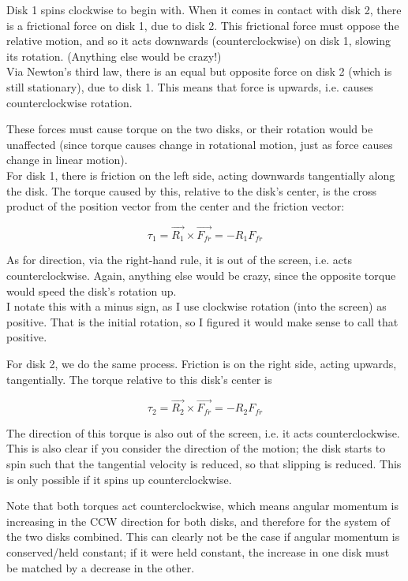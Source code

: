 \documentclass[8.01x]{subfiles}
\begin{document}
Disk 1 spins clockwise to begin with. When it comes in contact with disk 2, there is a frictional force on disk 1, due to disk 2. This frictional force must oppose the relative motion, and so it acts downwards (counterclockwise) on disk 1, slowing its rotation. (Anything else would be crazy!)\\
Via Newton's third law, there is an equal but opposite force on disk 2 (which is still stationary), due to disk 1. This means that force is upwards, i.e. causes counterclockwise rotation.

These forces must cause torque on the two disks, or their rotation would be unaffected (since torque causes change in rotational motion, just as force causes change in linear motion).\\
For disk 1, there is friction on the left side, acting downwards tangentially along the disk. The torque caused by this, relative to the disk's center, is the cross product of the position vector from the center and the friction vector:

\begin{equation}
\tau_1 = \vec{R_1} \times \vec{F_{fr}} = -R_1 F_{fr}
\end{equation}

As for direction, via the right-hand rule, it is out of the screen, i.e. acts counterclockwise. Again, anything else would be crazy, since the opposite torque would speed the disk's rotation up.\\
I notate this with a minus sign, as I use clockwise rotation (into the screen) as positive. That is the initial rotation, so I figured it would make sense to call that positive.

For disk 2, we do the same process. Friction is on the right side, acting upwards, tangentially. The torque relative to this disk's center is

\begin{equation}
\tau_2 = \vec{R_2} \times \vec{F_{fr}} = -R_2 F_{fr}
\end{equation}

The direction of this torque is also out of the screen, i.e. it acts counterclockwise. This is also clear if you consider the direction of the motion; the disk starts to spin such that the tangential velocity is reduced, so that slipping is reduced. This is only possible if it spins up counterclockwise.

Note that both torques act counterclockwise, which means angular momentum is increasing in the CCW direction for both disks, and therefore for the system of the two disks combined. This can clearly not be the case if angular momentum is conserved/held constant; if it were held constant, the increase in one disk must be matched by a decrease in the other.
\end{document}
